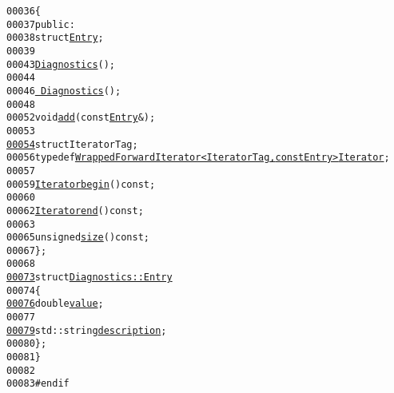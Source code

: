\begin{footnotesize}
\begin{alltt}
00036     \{
00037         \textcolor{keyword}{public}:
00038             \textcolor{keyword}{struct }\hyperlink{structeos_1_1Diagnostics_1_1Entry}{Entry};
00039 
00043             \hyperlink{classeos_1_1Diagnostics_aeff0c4ba0db58891ead8bc4e5a17d075}{Diagnostics}();
00044 
00046             \hyperlink{classeos_1_1Diagnostics_a95753f31bc63bad2b51b8699be04f01d}{~Diagnostics}();
00048 
00052             \textcolor{keywordtype}{void} \hyperlink{classeos_1_1Diagnostics_a1c1e295724886603c8842e278ab62bbc}{add}(\textcolor{keyword}{const} \hyperlink{structeos_1_1Diagnostics_1_1Entry}{Entry} &);
00053 
\hypertarget{diagnostics_8hh_source_l00054}{}\hyperlink{classeos_1_1Diagnostics_a53e47703a0b60c37caf9cc2f29606692}{00054}             \textcolor{keyword}{struct }IteratorTag;
00056             \textcolor{keyword}{typedef} \hyperlink{classeos_1_1WrappedForwardIterator}{WrappedForwardIterator<IteratorTag, const Entry>} \hyperlink{classeos_1_1WrappedForwardIterator}{Iterator};
00057 
00059             \hyperlink{classeos_1_1WrappedForwardIterator}{Iterator} \hyperlink{classeos_1_1Diagnostics_a98edcfc773cbdf2384b6180cd1a8aebc}{begin}() \textcolor{keyword}{const};
00060 
00062             \hyperlink{classeos_1_1WrappedForwardIterator}{Iterator} \hyperlink{classeos_1_1Diagnostics_a0e10cf2a79180f04b2d5c5100447ddb4}{end}() \textcolor{keyword}{const};
00063 
00065             \textcolor{keywordtype}{unsigned} \hyperlink{classeos_1_1Diagnostics_a791a35a96b5661232ca9797e7a48c5e8}{size}() \textcolor{keyword}{const};
00067     \};
00068 
\hypertarget{diagnostics_8hh_source_l00073}{}\hyperlink{structeos_1_1Diagnostics_1_1Entry}{00073}     \textcolor{keyword}{struct }\hyperlink{structeos_1_1Diagnostics_1_1Entry}{Diagnostics::Entry}
00074     \{
\hypertarget{diagnostics_8hh_source_l00076}{}\hyperlink{structeos_1_1Diagnostics_1_1Entry_a979ae5967f4627300e5db3d5db042b26}{00076}         \textcolor{keywordtype}{double} \hyperlink{structeos_1_1Diagnostics_1_1Entry_a979ae5967f4627300e5db3d5db042b26}{value};
00077 
\hypertarget{diagnostics_8hh_source_l00079}{}\hyperlink{structeos_1_1Diagnostics_1_1Entry_af5b2da237c7151b5c45ca9fe627fbd86}{00079}         std::string \hyperlink{structeos_1_1Diagnostics_1_1Entry_af5b2da237c7151b5c45ca9fe627fbd86}{description};
00080     \};
00081 \}
00082 
00083 \textcolor{preprocessor}{#endif}
\end{alltt}\end{footnotesize}
